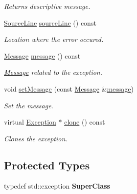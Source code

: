\begin{DoxyCompactItemize}
\begin{DoxyCompactList}\small\item\em Returns descriptive message. \end{DoxyCompactList}\item 
\hyperlink{class_source_line}{Source\+Line} \hyperlink{class_exception_a67f40ff3ea7f1c07e46222c38dcbaf43}{source\+Line} () const \hypertarget{class_exception_a67f40ff3ea7f1c07e46222c38dcbaf43}{}\label{class_exception_a67f40ff3ea7f1c07e46222c38dcbaf43}

\begin{DoxyCompactList}\small\item\em Location where the error occured. \end{DoxyCompactList}\item 
\hyperlink{class_message}{Message} \hyperlink{class_exception_aab5c1504a18016fdfe7574eb81f59ac6}{message} () const \hypertarget{class_exception_aab5c1504a18016fdfe7574eb81f59ac6}{}\label{class_exception_aab5c1504a18016fdfe7574eb81f59ac6}

\begin{DoxyCompactList}\small\item\em \hyperlink{class_message}{Message} related to the exception. \end{DoxyCompactList}\item 
void \hyperlink{class_exception_ad508783fa44767e8fedb6472a4180234}{set\+Message} (const \hyperlink{class_message}{Message} \&\hyperlink{class_exception_aab5c1504a18016fdfe7574eb81f59ac6}{message})\hypertarget{class_exception_ad508783fa44767e8fedb6472a4180234}{}\label{class_exception_ad508783fa44767e8fedb6472a4180234}

\begin{DoxyCompactList}\small\item\em Set the message. \end{DoxyCompactList}\item 
virtual \hyperlink{class_exception}{Exception} $\ast$ \hyperlink{class_exception_ad05463060510ad131ccaaafa6b63b2d7}{clone} () const \hypertarget{class_exception_ad05463060510ad131ccaaafa6b63b2d7}{}\label{class_exception_ad05463060510ad131ccaaafa6b63b2d7}

\begin{DoxyCompactList}\small\item\em Clones the exception. \end{DoxyCompactList}\end{DoxyCompactItemize}
\subsection*{Protected Types}
\begin{DoxyCompactItemize}
\item 
typedef std\+::exception {\bfseries Super\+Class}\hypertarget{class_exception_a5086086062a7ec2cfe4e609026adfbd9}{}\label{class_exception_a5086086062a7ec2cfe4e609026adfbd9}

\end{DoxyCompactItemize}
